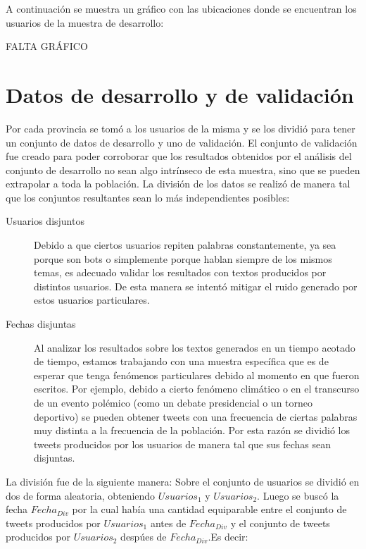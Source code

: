 A continuación se muestra un gráfico con las ubicaciones donde se encuentran los usuarios de la muestra de desarrollo:

FALTA GRÁFICO


\section{Datos de desarrollo y de validación}

Por cada provincia se tomó a los usuarios de la misma y se los dividió para tener un conjunto de datos de desarrollo y uno de validación. El conjunto de validación fue creado para poder corroborar que los resultados obtenidos por el análisis del conjunto de desarrollo no sean algo intrínseco de esta muestra, sino que se pueden extrapolar a toda la población. 
La división de los datos se realizó de manera tal que los conjuntos resultantes sean lo más independientes posibles: 
\begin{description}
    \item [Usuarios disjuntos] Debido a que ciertos usuarios repiten palabras constantemente, ya sea porque son bots o simplemente porque hablan siempre de los mismos temas, es adecuado validar los resultados con textos producidos por distintos usuarios. De esta manera se intentó mitigar el ruido generado por estos usuarios particulares.
    \item [Fechas disjuntas] Al analizar los resultados sobre los textos generados en un tiempo acotado de tiempo, estamos trabajando con una muestra específica que es de esperar que tenga fenómenos particulares debido al momento en que fueron escritos. Por ejemplo, debido a cierto fenómeno climático o en el transcurso de un evento polémico (como un debate presidencial o un torneo deportivo) se pueden obtener tweets con una frecuencia de ciertas palabras muy distinta a la frecuencia de la población. Por esta razón se dividió los tweets producidos por los usuarios de manera tal que sus fechas sean disjuntas.
\end{description}

La división fue de la siguiente manera:
Sobre el conjunto de usuarios se dividió en dos de forma aleatoria, obteniendo $Usuarios_1$ y $Usuarios_2$. Luego se buscó la fecha $Fecha_{Div}$ por la cual había una cantidad equiparable entre el conjunto de tweets producidos por  $Usuarios_1$ antes de $Fecha_{Div}$ y el conjunto de tweets producidos por $Usuarios_2$ despúes de $Fecha_{Div}$.Es decir:

